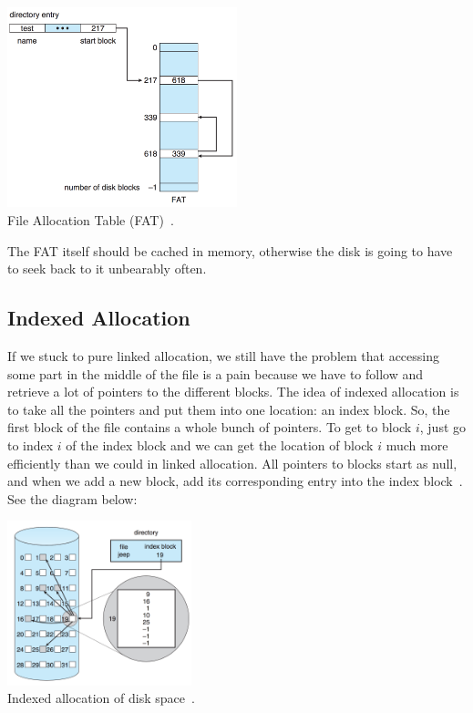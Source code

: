 \begin{center}
	\includegraphics[width=0.5\textwidth]{images/file-allocation-table.png}\\
	File Allocation Table (FAT)~\cite{osc}.
\end{center}

The FAT itself should be cached in memory, otherwise the disk is going to have to seek back to it unbearably often.

\subsection*{Indexed Allocation}
If we stuck to pure linked allocation, we still have the problem that accessing some part in the middle of the file is a pain because we have to follow and retrieve a lot of pointers to the different blocks. The idea of indexed allocation is to take all the pointers and put them into one location: an index block. So, the first block of the file contains a whole bunch of pointers. To get to block $i$, just go to index $i$ of the index block and we can get the location of block $i$ much more efficiently than we could in linked allocation. All pointers to blocks start as null, and when we add a new block, add its corresponding entry into the index block~\cite{osc}. See the diagram below:

\begin{center}
	\includegraphics[width=0.4\textwidth]{images/disk-indexed.png}\\
	Indexed allocation of disk space~\cite{osc}.
\end{center}

